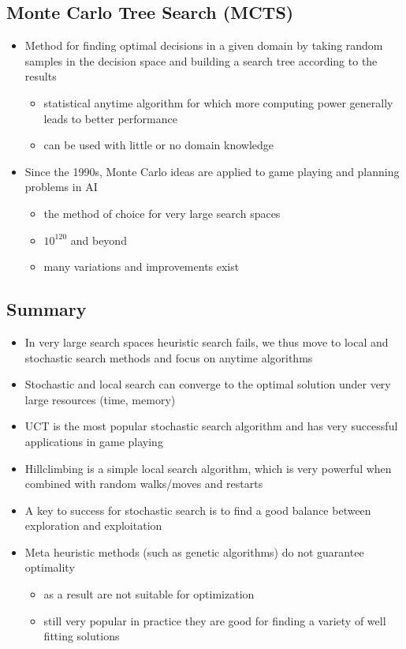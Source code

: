 \documentclass[conference]{styles/acmsiggraph}
\begin{document}
    \subsection{Monte Carlo Tree Search (MCTS)}
        \begin{itemize}
            \item Method for finding optimal decisions in a given domain by taking random samples in the decision space and building a search tree according to the results
                \begin{itemize}
                    \item statistical anytime algorithm for which more computing power generally leads to better performance
                    \item can be used with little or no domain knowledge
                \end{itemize}
            \item Since the 1990s, Monte Carlo ideas are applied to game playing and planning problems in AI
                \begin{itemize}
                    \item the method of choice for very large search spaces
                    \item $10^{120}$ and beyond
                    \item many variations and improvements exist
                \end{itemize}
        \end{itemize}


    \subsection{Summary}
        \begin{itemize}
            \item In very large search spaces heuristic search fails, we thus move to local and stochastic search methods and focus on anytime algorithms
            \item Stochastic and local search can converge to the optimal solution under very large resources (time, memory)
            \item UCT is the most popular stochastic search algorithm and has very successful applications in game playing
            \item Hillclimbing is a simple local search algorithm, which is very powerful when combined with random walks/moves and restarts
            \item A key to success for stochastic search is to find a good balance between exploration and exploitation
            \item Meta heuristic methods (such as genetic algorithms) do not guarantee optimality
                \begin{itemize}
                    \item as a result are not suitable for optimization
                    \item still very popular in practice they are good for finding a variety of well fitting solutions
                \end{itemize}
        \end{itemize}
    
\end{document}
